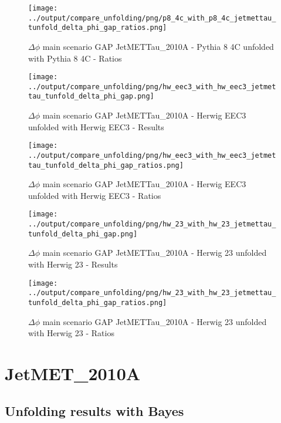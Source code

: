 \documentclass[11pt]{book}
\begin{document}
\begin{figure}[ht]
\centering
\texttt{[image: ../output/compare\_unfolding/png/p8\_4c\_with\_p8\_4c\_jetmettau\_tunfold\_delta\_phi\_gap\_ratios.png]}
\caption{$\Delta\phi$ main scenario GAP JetMETTau\_2010A - Pythia 8 4C unfolded with Pythia 8 4C - Ratios}
\label{p8_p8_jetmettau_tunfold_delta_phi_gap_b}
\end{figure}

\begin{figure}[ht]
\centering
\texttt{[image: ../output/compare\_unfolding/png/hw\_eec3\_with\_hw\_eec3\_jetmettau\_tunfold\_delta\_phi\_gap.png]}
\caption{$\Delta\phi$ main scenario GAP JetMETTau\_2010A - Herwig EEC3 unfolded with Herwig EEC3 - Results}
\label{hw_eec3_hw_eec3_jetmettau_tunfold_delta_phi_gap_a}
\end{figure}

\begin{figure}[ht]
\centering
\texttt{[image: ../output/compare\_unfolding/png/hw\_eec3\_with\_hw\_eec3\_jetmettau\_tunfold\_delta\_phi\_gap\_ratios.png]}
\caption{$\Delta\phi$ main scenario GAP JetMETTau\_2010A - Herwig EEC3 unfolded with Herwig EEC3 - Ratios}
\label{hw_eec3_hw_eec3_jetmettau_tunfold_delta_phi_gap_b}
\end{figure}

\begin{figure}[ht]
\centering
\texttt{[image: ../output/compare\_unfolding/png/hw\_23\_with\_hw\_23\_jetmettau\_tunfold\_delta\_phi\_gap.png]}
\caption{$\Delta\phi$ main scenario GAP JetMETTau\_2010A - Herwig 23 unfolded with Herwig 23 - Results}
\label{hw_23_hw_23_jetmettau_tunfold_delta_phi_gap_a}
\end{figure}

\begin{figure}[ht]
\centering
\texttt{[image: ../output/compare\_unfolding/png/hw\_23\_with\_hw\_23\_jetmettau\_tunfold\_delta\_phi\_gap\_ratios.png]}
\caption{$\Delta\phi$ main scenario GAP JetMETTau\_2010A - Herwig 23 unfolded with Herwig 23 - Ratios}
\label{hw_23_hw_23_jetmettau_tunfold_delta_phi_gap_b}
\end{figure}


\section{JetMET\_2010A}
\subsection{Unfolding results with Bayes}
\end{document}

